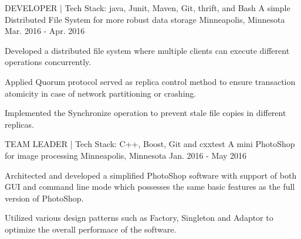 \begin{cventries}
  \cventry
    {DEVELOPER \enskip | \enskip Tech Stack: java, Junit, Maven, Git, thrift, and Bash} %
    {A simple Distributed File System for more robust data storage} %
    {Minneapolis, Minnesota} %
    {Mar. 2016 - Apr. 2016} %
    {
      \begin{cvitems} %
        \item {Developed a distributed file system where multiple clients can execute different operations concurrently.}
        \item {Applied Quorum protocol served as replica control method to ensure transaction atomicity in case of network partitioning or crashing.}
        \item {Implemented the Synchronize operation to prevent stale file copies in different replicas.}
      \end{cvitems}
    }

  \cventry
    {TEAM LEADER \enskip | \enskip Tech Stack: C++, Boost, Git and cxxtest} %
    {A mini PhotoShop for image processing} %
    {Minneapolis, Minnesota} %
    {Jan. 2016 - May 2016} %
    {
      \begin{cvitems} %
        \item {Architected and developed a simplified PhotoShop software with support of both GUI and command line mode which possesses the same basic features as the full version of PhotoShop.}
        \item {Utilized various design patterns such as Factory, Singleton and Adaptor to optimize the overall performace of the software.}
      \end{cvitems}
    }

\end{cventries}
